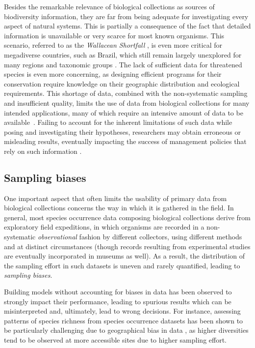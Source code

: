 Besides the remarkable relevance of biological collections as sources of biodiversity information, they are far from being adequate for investigating every aspect of natural systems.
This is partially a consequence of the fact that detailed information is unavailable or very scarce for most known organisms.
This scenario, referred to as the \textit{Wallacean Shortfall} \cite{Lomolino2004}, is even more critical for megadiverse countries, such as Brazil, which still remain largely unexplored for many regions and taxonomic groups \cite{Soberon2004}.
The lack of sufficient data for threatened species is even more concerning, as designing efficient programs for their conservation require knowledge on their geographic distribution and ecological requirements.
This shortage of data, combined with the non-systematic sampling and insufficient quality, limits the use of data from biological collections for many intended applications, many of which require an intensive amount of data to be available~\cite{Guisan2007}.
Failing to account for the inherent limitations of such data while posing and investigating their hypotheses, researchers may obtain erroneous or misleading results, eventually impacting the success of management policies that rely on such information \cite{Chapman2005}.


\subsection{Sampling biases}
One important aspect that often limits the usability of primary data from biological collections concerns the way in which it is gathered in the field.
In general, most species occurrence data composing biological collections derive from exploratory field expeditions, in which organisms are recorded in a non-systematic \textit{observational} fashion by different collectors, using different methods and at distinct circumstances (though records resulting from experimental studies are eventually incorporated in museums as well). 
As a result, the distribution of the sampling effort in such datasets is uneven and rarely quantified, leading to \textit{sampling biases}.

Building models without accounting for biases in data has been observed to strongly impact their performance, leading to spurious results which can be misinterpreted and, ultimately, lead to wrong decisions.
For instance, assessing patterns of species richness from species occurrence datasets has been shown to be particularly challenging due to geographical bias in data \cite{Hortal2007,Reddy2003}, as higher diversities tend to be observed at more accessible sites due to higher sampling effort.

